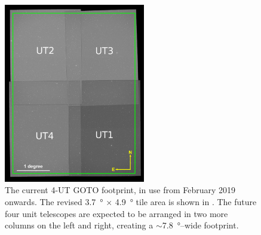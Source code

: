 \begin{colsection}
\begin{colsection}
\begin{figure}[p]
    \begin{center}
        \includegraphics[width=0.55\textwidth]{images/footprint_2_box.png}
    \end{center}
    \caption[The current 4-UT GOTO footprint]{
        The current 4-UT GOTO footprint, in use from February 2019 onwards. The revised \SI{3.7}{\degree} $\times$ \SI{4.9}{\degree} tile area is shown in . The future four unit telescopes are expected to be arranged in two more columns on the left and right, creating a $\sim$\SI{7.8}{\degree}--wide footprint.
    }\label{fig:4ut_footprint}
\end{figure}

\clearpage


\end{colsection}
\end{colsection}
